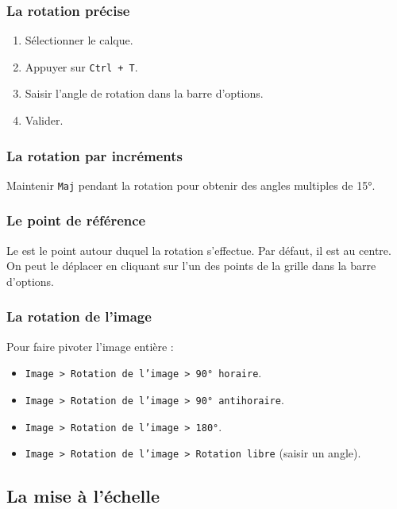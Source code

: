 \subsubsection{La rotation précise}

\begin{enumerate}
    \item Sélectionner le calque.
    \item Appuyer sur \texttt{Ctrl + T}.
    \item Saisir l'angle de rotation dans la barre d'options.
    \item Valider.
\end{enumerate}

\subsubsection{La rotation par incréments}

Maintenir \texttt{Maj} pendant la rotation pour obtenir des angles multiples de 15°.

\subsubsection{Le point de référence}

Le  est le point autour duquel la rotation s'effectue. Par défaut, il est au centre. On peut le déplacer en cliquant sur l'un des points de la grille dans la barre d'options.

\subsubsection{La rotation de l'image}

Pour faire pivoter l'image entière :

\begin{itemize}
    \item \texttt{Image > Rotation de l'image > 90° horaire}.
    \item \texttt{Image > Rotation de l'image > 90° antihoraire}.
    \item \texttt{Image > Rotation de l'image > 180°}.
    \item \texttt{Image > Rotation de l'image > Rotation libre} (saisir un angle).
\end{itemize}

\subsection{La mise à l'échelle}

